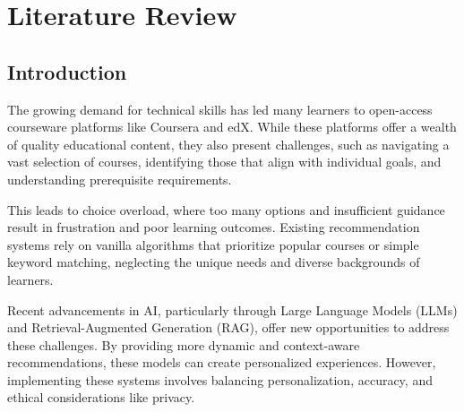 \chapter{Literature Review} \label{chap:chap-2}




    


\section{Introduction}
The growing demand for technical skills has led many learners to open-access courseware platforms like Coursera and edX. While these platforms offer a wealth of quality educational content, they also present challenges, such as navigating a vast selection of courses, identifying those that align with individual goals, and understanding prerequisite requirements. 

This leads to choice overload, where too many options and insufficient guidance result in frustration and poor learning outcomes. Existing recommendation systems rely on vanilla algorithms that prioritize popular courses or simple keyword matching, neglecting the unique needs and diverse backgrounds of learners. 

Recent advancements in AI, particularly through Large Language Models (LLMs) and Retrieval-Augmented Generation (RAG), offer new opportunities to address these challenges. By providing more dynamic and context-aware recommendations, these models can create personalized experiences. However, implementing these systems involves balancing personalization, accuracy, and ethical considerations like privacy.


